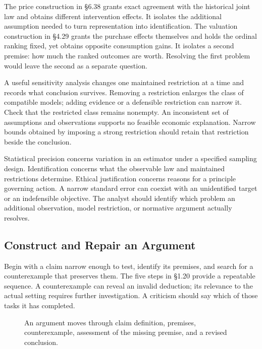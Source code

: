 \noindent \noindent The price construction in §6.38 grants exact agreement with
the historical joint law and obtains different intervention effects. It
isolates the additional assumption needed to turn representation into
identification. The valuation construction in §4.29 grants the purchase
effects themselves and holds the ordinal ranking fixed, yet obtains
opposite consumption gains. It isolates a second premise: how much the
ranked outcomes are worth. Resolving the first problem would leave the
second as a separate question.

A useful sensitivity analysis changes one maintained restriction at a
time and records what conclusion survives. Removing a restriction
enlarges the class of compatible models; adding evidence or a defensible
restriction can narrow it. Check that the restricted class remains
nonempty. An inconsistent set of assumptions and observations supports
no feasible economic explanation. Narrow bounds obtained by imposing a
strong restriction should retain that restriction beside the conclusion.

Statistical precision concerns variation in an estimator under a
specified sampling design. Identification concerns what the observable
law and maintained restrictions determine. Ethical justification
concerns reasons for a principle governing action. A narrow standard
error can coexist with an unidentified target or an indefensible
objective. The analyst should identify which problem an additional
observation, model restriction, or normative argument actually resolves.

\hypertarget{M09-construct-and-repair-an-argument}{%
\subsection{Construct and Repair an
Argument}\label{M09-construct-and-repair-an-argument}}

\noindent \noindent Begin with a claim narrow enough to test, identify its
premises, and search for a counterexample that preserves them. The five
steps in §1.20 provide a repeatable sequence. A counterexample can
reveal an invalid deduction; its relevance to the actual setting
requires further investigation. A criticism should say which of those
tasks it has completed.

\begin{figure}[htbp]
\centering

\caption{An argument moves through claim definition, premises, counterexample, assessment of the missing premise, and a revised conclusion.}\label{fig:M09_argument_revision}
\end{figure}


